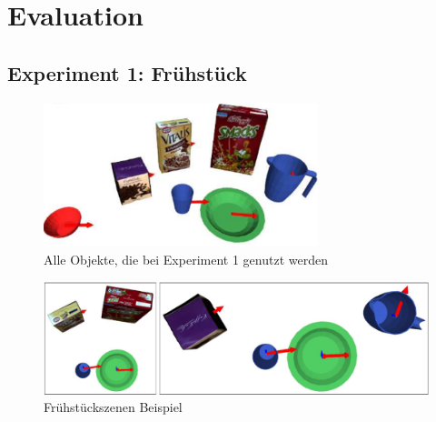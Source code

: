 \chapter{Evaluation}\label{ch:evaluation}
\section{Experiment 1: Frühstück}
\begin{figure}
	\centering
	\includegraphics[width=8cm]{bilder/allobjects.pdf}
	\caption{Alle Objekte, die bei Experiment 1 genutzt werden \cite{gassner17}}
	\label{img:allobjects}
\end{figure}
\begin{figure}
	\centering
	\includegraphics[width=14cm]{bilder/fruehstueckszenen.pdf}
	\caption{Fr{\"u}hst{\"u}ckszenen Beispiel \cite{gassner17}}
	\label{img:fruehstueckexample}
\end{figure}
